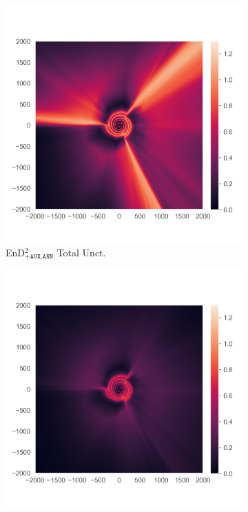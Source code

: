 \begin{figure}
\begin{subfigure}{0.22\textwidth}
  \centering
  \includegraphics[trim=42 45 15 55, clip, width=\linewidth]{../openreview/plots/3j.png}
  \caption{EnD$^2_{\texttt{+AUX,ANN}}$ Total Unct.}
  \label{fig:3g}
\end{subfigure}%
\begin{subfigure}{0.22\textwidth}
  \centering
  \includegraphics[trim=42 45 15 55, clip, width=\linewidth]{../openreview/plots/3k.png}

\end{subfigure}
\end{figure}
